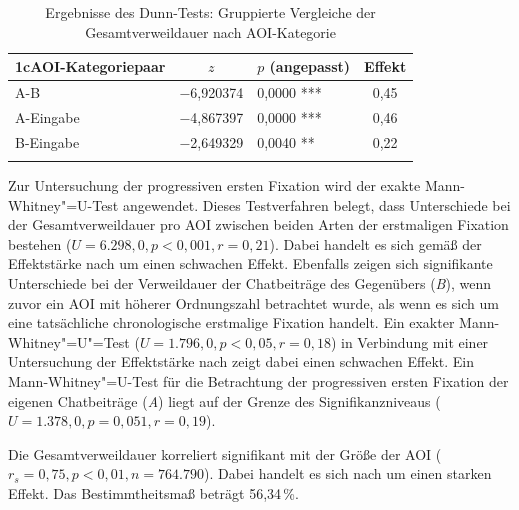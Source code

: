 
\vfill
\begin{table}[H]
    \begin{tabular}{lclc}  
    \lsptoprule
        {1}{c}{AOI-Kategoriepaar} & \multicolumn{1}{c}{$z$} & \multicolumn{1}{c}{$p$ (angepasst)} & {Effekt} \\
        \midrule
        A-B       & −6,920374 & 0,0000 *** & 0,45 \\ 
        A-Eingabe & −4,867397 & 0,0000 *** & 0,46 \\ 
        B-Eingabe & −2,649329 & 0,0040 ** & 0,22 \\ 
        \lspbottomrule
    \end{tabular}
    \caption{Ergebnisse des Dunn-Tests: Gruppierte Vergleiche der Gesamtverweildauer nach AOI-Kategorie}
    \label{K6:tab:DeDe:dunntest-dwell}
\end{table}
\vfill\pagebreak


Zur Untersuchung der progressiven ersten Fixation wird der exakte Mann-Whitney"=U-Test angewendet. Dieses Testverfahren belegt, dass Unterschiede bei der Gesamtverweildauer pro AOI zwischen beiden Arten der erstmaligen Fixation bestehen ($U = 6.298,0, p < 0,001, r = 0,21$). Dabei handelt es sich gemäß der Effektstärke nach \citet{cohen_power_1992} um einen schwachen Effekt. Ebenfalls zeigen sich signifikante Unterschiede bei der Verweildauer der Chatbeiträge des Gegenübers (\emph{B}), wenn zuvor ein AOI mit höherer Ordnungszahl betrachtet wurde, als wenn es sich um eine tatsächliche chronologische erstmalige Fixation handelt. Ein exakter Mann-Whitney"=U"=Test ($U = 1.796,0, p < 0,05, r = 0,18$) in Verbindung mit einer Untersuchung der Effektstärke nach \citet{cohen_power_1992} zeigt dabei einen schwachen Effekt. Ein Mann-Whitney"=U-Test für die Betrachtung der progressiven ersten Fixation der eigenen Chatbeiträge (\emph{A}) liegt auf der Grenze des Signifikanzniveaus ($U = 1.378,0, p = 0,051, r = 0,19$).

Die Gesamtverweildauer korreliert signifikant mit der Größe der AOI ($r_{s} = 0,75, p < 0,01, n = 764.790$). Dabei handelt es sich nach \citet{cohen_power_1992} um einen starken Effekt. Das Bestimmtheitsmaß beträgt 56,34\,\%.


